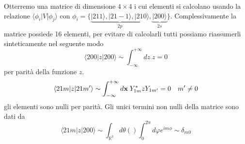 Otterremo una matrice di  dimensione $4 \times 4$ i cui elementi si calcolano usando la relazione  $\langle \phi_i|V|\phi_j \rangle $ con $\phi_i = \{ \underbrace{ |211 \rangle, |21-1\rangle ,|210 \rangle }_{2p}, \underbrace{|200 \rangle}_{2s} \}$. Complessivamente la matrice possiede 16 elementi, per evitare di calcolarli tutti possiamo riassumerli sinteticamente nel seguente modo
\begin{equation*}
	\langle 200|z|200 \rangle  \sim \int_{-\infty}^{+\infty}dz  \; z = 0
\end{equation*}
per parit\`a della funzione $z$. 
\begin{equation*}
	\langle 21m|z|21m'\rangle \sim \int_{- \infty} ^{+ \infty}d\bold{x} \; Y_{1m}^*zY_{1m'} = 0 \quad m' \neq 0
\end{equation*}
gli elementi sono nulli per parit\`a. Gli unici termini non nulli della matrice sono dati da 
\begin{equation*}
	\langle 21m|z|200 \rangle \sim \int_{\mathbb{R}^3} d\theta() \int_{0}^{2\pi} d\varphi e^{im \phi} \sim \delta_{m0}
\end{equation*}

